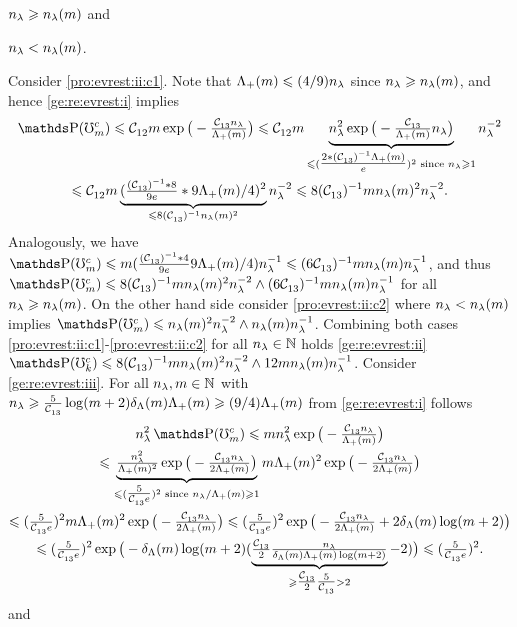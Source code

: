 \begin{pro}
\begin{inparaenum}[i]
$\ssE\geq\ssE(\Di)$
and \item\label{pro:evrest:ii:c2}$\ssE<\ssE(\Di)$.
\end{inparaenum}
Consider \ref{pro:evrest:ii:c1}. Note that $ \miSv\leq (4/9)\ssE$ since
$\ssE\geq\ssE(\Di)$, and hence \ref{ge:re:evrest:i} implies 
\begin{multline*}
  \P(\aixEv^c)
  \leq\cst{12}\Di\exp\big(-\tfrac{\cst{13}\ssE}{\miSv}\big)\leq\cst{12}\Di\underbrace{\ssE^2\exp\big(-\tfrac{\cst{13}}{\miSv}\ssE\big)}_{\leq
  (\tfrac{2*(\cst{13})^{-1}\miSv}{e})^{2}\text{ since }\ssE\geq1} \ssE^{-2}\\\leq\cst{12}\Di\underbrace{(\tfrac{(\cst{13})^{-1}*8}{9e}*9\miSv/4)^2}_{\leq 8(\cst{13})^{-1}\ssE(\Di)^2}
\ssE^{-2}\leq 8 (\cst{13})^{-1}\Di\ssE(m)^2\ssE^{-2}.
\end{multline*}
Analogously, we
have $\P(\aixEv^c)\leq \Di (\tfrac{(\cst{13})^{-1}*4}{9e}9\miSv/4) \ssE^{-1}\leq
(6\cst{13})^{-1}\Di\ssE(\Di)\ssE^{-1}$, and thus
$\P(\aixEv^c)\leq 8 (\cst{13})^{-1}\Di\ssE(\Di)^2\ssE^{-2}\wedge (6\cst{13})^{-1}\Di\ssE(\Di)\ssE^{-1}$
for all $\ssE\geq\ssE(\Di)$. On the other hand side consider
\ref{pro:evrest:ii:c2} where $\ssE<\ssE(\Di)$ implies
$\P(\aixEv^c)\leq \ssE(\Di)^2\ssE^{-2}\wedge\ssE(\Di)\ssE^{-1}$. Combining both cases
\ref{pro:evrest:ii:c1}-\ref{pro:evrest:ii:c2} for all
$\ssE\in\Nz$ holds \ref{ge:re:evrest:ii}
$\P(\aixEv[k]^c)\leq
8 (\cst{13})^{-1}\Di\ssE(\Di)^2\ssE^{-2}\wedge12\Di\ssE(\Di)\ssE^{-1}$.
Consider \ref{ge:re:evrest:iii}. %
For all $\ssE,\Di\in\Nz$ with $\ssE\geq \tfrac{5}{\cst{13}}\log(\Di+2)\cmiSv\miSv\geq
(9/4)\miSv[\Di]$ from \ref{ge:re:evrest:i} follows 
\begin{multline*}
\ssE^2\P(\aixEv^c)\leq \Di\ssE^2\exp\big(-\tfrac{\cst{13}\ssE}{\miSv}\big)\\
\leq\underbrace{\tfrac{\ssE^2}{\miSv^2}\exp\big(-\tfrac{\cst{13}\ssE}{2\miSv}\big)}_{\leq(\tfrac{5}{\cst{13}e})^2\text{ since }\ssE/\miSv\geq1}\Di\miSv^2\exp\big(-\tfrac{\cst{13}\ssE}{2\miSv}\big)\\
\leq (\tfrac{5}{\cst{13}e})^2 \Di\miSv^2\exp\big(-\tfrac{\cst{13}\ssE}{2\miSv}\big)
\leq(\tfrac{5}{\cst{13}e})^2\exp\big(-\tfrac{\cst{13}\ssE}{2\miSv}+2\cmiSv\log(\Di+2)\big)\\
\leq(\tfrac{5}{\cst{13}e})^2\exp\big(-\cmiSv\log(\Di+2)(\underbrace{\tfrac{\cst{13}}{2}\tfrac{\ssE}{\cmiSv\miSv\log(\Di+2)}}_{\geq\tfrac{\cst{13}}{2}\tfrac{5}{\cst{13}}>2}-2)\big)
\leq(\tfrac{5}{\cst{13}e})^2.
\end{multline*}
and
\begin{multline*}

\end{multline*}
\end{pro}
